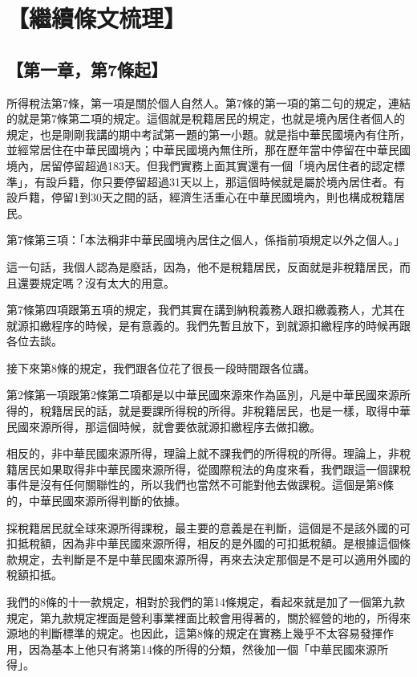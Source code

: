 \documentclass[]{ctexbook}
\begin{document}
\hypertarget{ux7e7cux7e8cux689dux6587ux68b3ux7406}{%
\section{【繼續條文梳理】}\label{ux7e7cux7e8cux689dux6587ux68b3ux7406}}

\hypertarget{ux7b2cux4e00ux7ae0ux7b2c7ux689dux8d77}{%
\subsection{【第一章，第7條起】}\label{ux7b2cux4e00ux7ae0ux7b2c7ux689dux8d77}}

所得稅法第7條，第一項是關於個人自然人。第7條的第一項的第二句的規定，連結的就是第7條第二項的規定。這個就是稅籍居民的規定，也就是境內居住者個人的規定，也是剛剛我講的期中考試第一題的第一小題。就是指中華民國境內有住所，並經常居住在中華民國境內；中華民國境內無住所，那在歷年當中停留在中華民國境內，居留停留超過183天。但我們實務上面其實還有一個「境內居住者的認定標準」，有設戶籍，你只要停留超過31天以上，那這個時候就是屬於境內居住者。有設戶籍，停留1到30天之間的話，經濟生活重心在中華民國境內，則也構成稅籍居民。

第7條第三項：「本法稱非中華民國境內居住之個人，係指前項規定以外之個人。」

這一句話，我個人認為是廢話，因為，他不是稅籍居民，反面就是非稅籍居民，而且還要規定嗎？沒有太大的用意。

第7條第四項跟第五項的規定，我們其實在講到納稅義務人跟扣繳義務人，尤其在就源扣繳程序的時候，是有意義的。我們先暫且放下，到就源扣繳程序的時候再跟各位去談。

接下來第8條的規定，我們跟各位花了很長一段時間跟各位講。

第2條第一項跟第2條第二項都是以中華民國來源來作為區別，凡是中華民國來源所得的，稅籍居民的話，就是要課所得稅的所得。非稅籍居民，也是一樣，取得中華民國來源所得，那這個時候，就會要依就源扣繳程序去做扣繳。

相反的，非中華民國來源所得，理論上就不課我們的所得稅的所得。理論上，非稅籍居民如果取得非中華民國來源所得，從國際稅法的角度來看，我們跟這一個課稅事件是沒有任何關聯性的，所以我們也當然不可能對他去做課稅。這個是第8條的，中華民國來源所得判斷的依據。

採稅籍居民就全球來源所得課稅，最主要的意義是在判斷，這個是不是該外國的可扣抵稅額，因為非中華民國來源所得，相反的是外國的可扣抵稅額。是根據這個條款規定，去判斷是不是中華民國來源所得，再來去決定那個是不是可以適用外國的稅額扣抵。

我們的8條的十一款規定，相對於我們的第14條規定，看起來就是加了一個第九款規定，第九款規定裡面是營利事業裡面比較會用得著的，關於經營的地的，所得來源地的判斷標準的規定。也因此，這第8條的規定在實務上幾乎不太容易發揮作用，因為基本上他只有將第14條的所得的分類，然後加一個「中華民國來源所得」。
\end{document}
